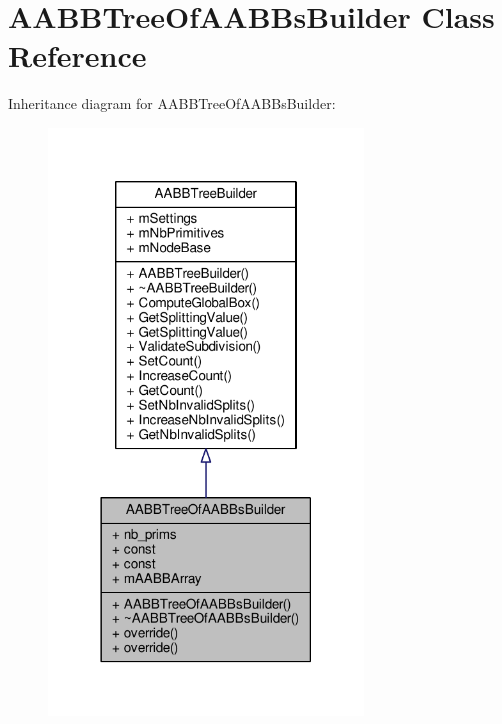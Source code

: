 \hypertarget{classAABBTreeOfAABBsBuilder}{}\section{A\+A\+B\+B\+Tree\+Of\+A\+A\+B\+Bs\+Builder Class Reference}
\label{classAABBTreeOfAABBsBuilder}


Inheritance diagram for A\+A\+B\+B\+Tree\+Of\+A\+A\+B\+Bs\+Builder\+:
\nopagebreak
\begin{figure}[H]
\begin{center}
\leavevmode
\includegraphics[width=237pt]{d3/d14/classAABBTreeOfAABBsBuilder__inherit__graph}
\end{center}
\end{figure}


